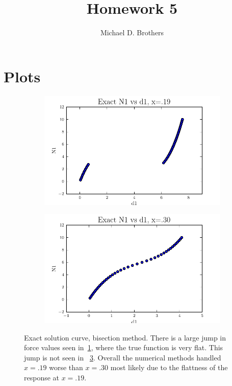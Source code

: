 \documentclass[10pt,letterpaper]{article}
\author{Michael D. Brothers}
\title{Homework 5}
\begin{document}
\section{Plots}

\begin{figure}[!tbh]
  \begin{subfigure}[b]{.6\textwidth}
    \includegraphics[width=\textwidth]{exact_x19.pdf}
    \caption{}
    \label{fig1:label:a}
  \end{subfigure}
  \hfill
  \begin{subfigure}[b]{.6\textwidth}
    \includegraphics[width=\textwidth]{exact_x30.pdf}
    \caption{}
    \label{fig1:label:b}
  \end{subfigure}
  \caption{Exact solution curve, bisection method. There is a large jump in force values seen in~\ref{fig1:label:a}, where the true function is very flat. This jump is not seen in ~\ref{fig1:label:b}. Overall the numerical methods handled $x=.19$ worse than $x=.30$ most likely due to the flattness of the response at $x=.19$.
}
\end{figure}
\end{document}
